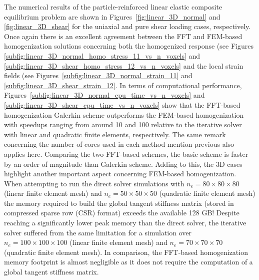 The numerical results of the particle-reinforced linear elastic composite equilibrium problem are shown in Figures~\ref{fig:linear_3D_normal} and \ref{fig:linear_3D_shear} for the uniaxial and pure shear loading cases, respectively.
Once again there is an excellent agreement between the FFT and FEM-based homogenization solutions concerning both the homogenized response (see Figures \ref{subfig:linear_3D_normal_homo_stress_11_vs_n_voxels} and \ref{subfig:linear_3D_shear_homo_stress_12_vs_n_voxels} and the local strain fields (see Figures~\ref{subfig:linear_3D_normal_strain_11} and \ref{subfig:linear_3D_shear_strain_12}.
In terms of computational performance, Figures~\ref{subfig:linear_3D_normal_cpu_time_vs_n_voxels} and \ref{subfig:linear_3D_shear_cpu_time_vs_n_voxels} show that the FFT-based homogenization Galerkin scheme outperforms the FEM-based homogenization with speedups ranging from around 10 and 100 relative to the iterative solver with linear and quadratic finite elements, respectively.
The same remark concerning the number of cores used in each method mention previous also applies here.
Comparing the two FFT-based schemes, the basic scheme is faster by an order of magnitude than Galerkin scheme.
Adding to this, the 3D cases highlight another important aspect concerning FEM-based homogenization. When attempting to run the direct solver simulations with \(n_{e}=80 \times 80 \times 80\) (linear finite element mesh) and \(n_{e}=50 \times 50 \times 50\) (quadratic finite element mesh) the memory required to build the global tangent stiffness matrix (stored in compressed sparse row (CSR) format) exceeds the available 128 GB!
Despite reaching a significantly lower peak memory than the direct solver, the iterative solver suffered from the same limitation for a simulation over \(n_{e}=100 \times 100 \times 100\) (linear finite element mesh) and \(n_{e}=70 \times 70 \times 70\) (quadratic finite element mesh).
In comparison, the FFT-based homogenization memory footprint is almost negligible as it does not require the computation of a global tangent stiffness matrix.

